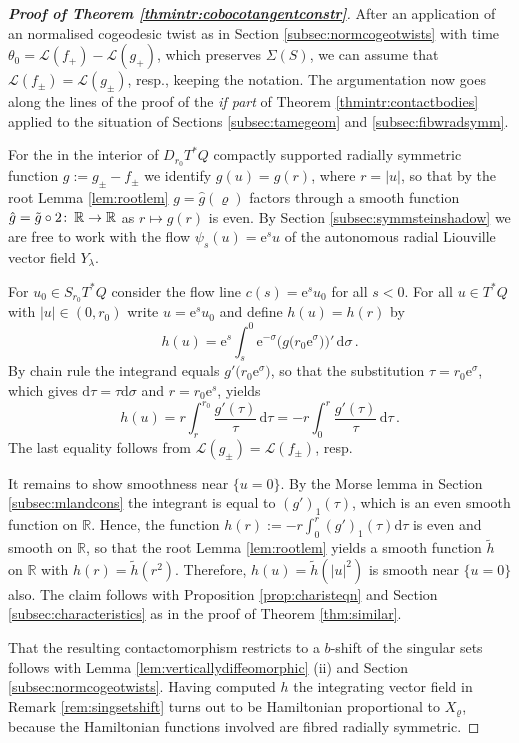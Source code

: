 \documentclass{amsart}
\theoremstyle{definition}
\def\co{\colon\thinspace}
\newcommand{\rmd}{\mathrm d}
\newcommand{\rme}{\mathrm e}
\newcommand{\LLL}{\mathscr L}
\newcommand{\R}{\mathbb R}
\newcommand{\ra}{\rightarrow}
\begin{document}
\begin{proof}[{\bf Proof of Theorem \ref{thmintr:cobocotangentconstr}}]
After an application of an
normalised cogeodesic twist
as in Section \ref{subsec:normcogeotwists}
with time $\theta_0=\LLL(f_+)-\LLL(g_+)$,
which preserves $\Sigma(S)$,
we can assume that
$\LLL(f_{\pm})=\LLL(g_{\pm})$, resp.,
keeping the notation.
The argumentation now goes along the lines
of the proof of the {\it if part} of
Theorem \ref{thmintr:contactbodies}
applied to the situation of
Sections \ref{subsec:tamegeom}
and \ref{subsec:fibwradsymm}.

For the in the interior of $D_{r_0}T^*Q$
compactly supported radially symmetric function
$g:=g_{\pm}-f_{\pm}$ we
identify $g(u)=g(r)$, where $r=|u|$,
so that by the root Lemma \ref{lem:rootlem}
$g=\hat{g}(\varrho)$ factors through a smooth function
$\hat{g}=\tilde{g}\circ2\co\R\ra\R$
as $r\mapsto g(r)$ is even.
By Section \ref{subsec:symmsteinshadow}
we are free to work with the flow
$\psi_s(u)=\rme^su$ of
the autonomous radial Liouville vector field
$Y_{\lambda}$.

For $u_0\in S_{r_0}T^*Q$
consider the flow line
$c(s)=\rme^su_0$ for all $s<0$.
For all $u\in T^*Q$ with $|u|\in(0,r_0)$
write $u=\rme^su_0$ and define $h(u)=h(r)$ by
  \[
    h(u)=
    \rme^s
        \int_s^0
          \rme^{-\sigma}
          \Big(g\big(r_0\rme^{\sigma}\big)\Big)'
          \,
        \rmd\sigma
        \,.
  \]
  By chain rule the integrand equals
  $g'\big(r_0\rme^{\sigma}\big)$,
  so that the substitution $\tau=r_0\rme^{\sigma}$,
  which gives $\rmd\tau=\tau\rmd\sigma$
  and $r=r_0\rme^s$, yields
  \[
    h(u)=r
        \int_r^{r_0}
          \frac{g'(\tau)}{\tau}
          \,
        \rmd\tau=
        -r
        \int_0^r
          \frac{g'(\tau)}{\tau}
          \,
        \rmd\tau
        \,.
  \]
  The last equality follows from
  $\LLL(g_{\pm})=\LLL(f_{\pm})$, resp.
  
  It remains to show smoothness near $\{u=0\}$.
  By the Morse lemma in Section \ref{subsec:mlandcons}
  the integrant is equal to $(g')_1(\tau)$,
  which is an even smooth function on $\R$.
  Hence,
  the function
  $h(r):=-r\int_0^r(g')_1(\tau)\rmd\tau$
  is even and smooth on $\R$,
  so that the root Lemma \ref{lem:rootlem} yields
  a smooth function
  $\tilde{h}$ on $\R$ with $h(r)=\tilde{h}(r^2)$.
  Therefore,
  $h(u)=\tilde{h}(|u|^2)$
  is smooth near $\{u=0\}$ also.
  The claim follows with 
  Proposition \ref{prop:charisteqn}
  and Section \ref{subsec:characteristics}
  as in the proof of Theorem \ref{thm:similar}.
  
  That the resulting contactomorphism
  restricts to a $b$-shift of the singular sets
  follows with
  Lemma \ref{lem:verticallydiffeomorphic} (ii)
  and
  Section \ref{subsec:normcogeotwists}.
  Having computed $h$
  the integrating vector field in  
  Remark \ref{rem:singsetshift}
  turns out to be Hamiltonian
  proportional to $X_{\varrho}$,
  because the Hamiltonian functions involved
  are fibred radially symmetric.
\end{proof}
\end{document}
